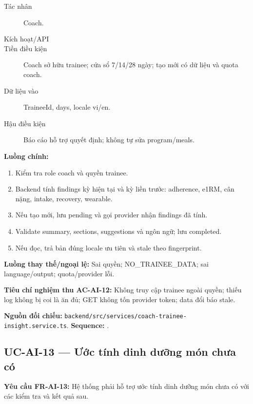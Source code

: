 \documentclass[12pt,a4paper]{article}
\newcommand{\evidence}[1]{{\small\nolinkurl{#1}}}
\begin{document}
\begin{description}
\item[Tác nhân] Coach.
\item[Kích hoạt/API] 
\item[Tiền điều kiện] Coach sở hữu trainee; cửa sổ 7/14/28 ngày; tạo mới có dữ liệu và quota coach.
\item[Dữ liệu vào] TraineeId, days, locale vi/en.
\item[Hậu điều kiện] Báo cáo hỗ trợ quyết định; không tự sửa program/meals.
\end{description}
\textbf{Luồng chính:}
\begin{enumerate}
  \item Kiểm tra role coach và quyền trainee.
  \item Backend tính findings kỳ hiện tại và kỳ liền trước: adherence, e1RM, cân nặng, intake, recovery, wearable.
  \item Nếu tạo mới, lưu pending và gọi provider nhận findings đã tính.
  \item Validate summary, sections, suggestions và ngôn ngữ; lưu completed.
  \item Nếu đọc, trả bản đúng locale ưu tiên và stale theo fingerprint.
\end{enumerate}
\textbf{Luồng thay thế/ngoại lệ:} Sai quyền; NO\_TRAINEE\_DATA; sai language/output; quota/provider lỗi.

\textbf{Tiêu chí nghiệm thu AC-AI-12:} Không truy cập trainee ngoài quyền; thiếu log không bị coi là ăn đủ; GET không tốn provider token; data đổi báo stale.

\textbf{Nguồn đối chiếu:} \evidence{backend/src/services/coach-trainee-insight.service.ts}. \textbf{Sequence:} .

\subsection{UC-AI-13 --- Ước tính dinh dưỡng món chưa có}
\label{uc-ai-13}
\textbf{Yêu cầu FR-AI-13:} Hệ thống phải hỗ trợ ước tính dinh dưỡng món chưa có với các kiểm tra và kết quả sau.
\end{document}
